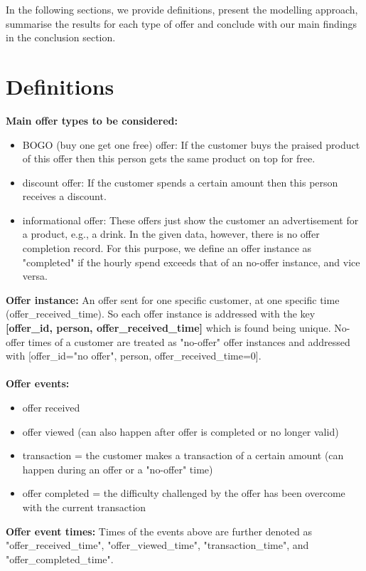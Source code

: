 \documentclass[11pt]{article} %
\begin{document}
In the following sections, we provide definitions, present the modelling approach, summarise the results for each type of offer and conclude with our main findings in the conclusion section.


\section{Definitions}
\textbf{Main offer types to be considered:}
\begin{itemize}
\item BOGO (buy one get one free) offer: If the customer buys the praised product of this offer then this person gets the same product on top for free.
\item discount offer: If the customer spends a certain amount then this person receives a discount.
\item informational offer: These offers just show the customer an advertisement for a product, e.g., a drink. In the given data, however, there is no offer completion record.
For this purpose, we define an offer instance as "completed" if the hourly spend exceeds that of an no-offer instance, and vice versa.
\end{itemize}
\noindent\textbf{Offer instance:} 
An offer sent for one specific customer, at one specific time (offer\_received\_time). So each offer instance is addressed with the key \textbf{[offer\_id, person, offer\_received\_time]} which is found being unique.
No-offer times of a customer are treated as "no-offer" offer instances and addressed with [offer\_id="no offer", person, offer\_received\_time=0].
\\
\\
\noindent\textbf{Offer events:} 
\begin{itemize}
\item offer received
\item offer viewed (can also happen after offer is completed or no longer valid)
\item transaction = the customer makes a transaction of a certain amount (can happen during an offer or a "no-offer" time)
\item offer completed = the difficulty challenged by the offer has been overcome with the current transaction
\end{itemize}
\noindent\textbf{Offer event times:} 
Times of the  events above are further denoted as "offer\_received\_time", "offer\_viewed\_time", "transaction\_time", and "offer\_completed\_time".
\\
\end{document}
